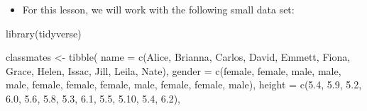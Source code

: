 \documentclass[
  letterpaper,
  DIV=11,
  numbers=noendperiod]{scrreprt}
\newenvironment{Shaded}{\begin{snugshade}}{\end{snugshade}}
\newcommand{\AttributeTok}[1]{\textcolor[rgb]{0.40,0.45,0.13}{#1}}
\newcommand{\FloatTok}[1]{\textcolor[rgb]{0.68,0.00,0.00}{#1}}
\newcommand{\FunctionTok}[1]{\textcolor[rgb]{0.28,0.35,0.67}{#1}}
\newcommand{\NormalTok}[1]{\textcolor[rgb]{0.00,0.23,0.31}{#1}}
\newcommand{\OtherTok}[1]{\textcolor[rgb]{0.00,0.23,0.31}{#1}}
\newcommand{\StringTok}[1]{\textcolor[rgb]{0.13,0.47,0.30}{#1}}
\providecommand{\tightlist}{%
  \setlength{\itemsep}{0pt}\setlength{\parskip}{0pt}}\usepackage{longtable,booktabs,array}
\begin{document}
\begin{itemize}
\tightlist
\item
  For this lesson, we will work with the following small data set:
\end{itemize}

\begin{Shaded}
\begin{Highlighting}[]
\FunctionTok{library}\NormalTok{(tidyverse)}

\NormalTok{classmates }\OtherTok{\textless{}{-}} \FunctionTok{tibble}\NormalTok{(}
  \AttributeTok{name =} \FunctionTok{c}\NormalTok{(}\StringTok{\textquotesingle{}Alice\textquotesingle{}}\NormalTok{, }\StringTok{\textquotesingle{}Brianna\textquotesingle{}}\NormalTok{, }\StringTok{\textquotesingle{}Carlos\textquotesingle{}}\NormalTok{, }\StringTok{\textquotesingle{}David\textquotesingle{}}\NormalTok{, }
           \StringTok{\textquotesingle{}Emmett\textquotesingle{}}\NormalTok{, }\StringTok{\textquotesingle{}Fiona\textquotesingle{}}\NormalTok{, }\StringTok{\textquotesingle{}Grace\textquotesingle{}}\NormalTok{, }\StringTok{\textquotesingle{}Helen\textquotesingle{}}\NormalTok{,}
           \StringTok{\textquotesingle{}Issac\textquotesingle{}}\NormalTok{, }\StringTok{\textquotesingle{}Jill\textquotesingle{}}\NormalTok{, }\StringTok{\textquotesingle{}Leila\textquotesingle{}}\NormalTok{, }\StringTok{\textquotesingle{}Nate\textquotesingle{}}\NormalTok{),}
  \AttributeTok{gender =} \FunctionTok{c}\NormalTok{(}\StringTok{\textquotesingle{}female\textquotesingle{}}\NormalTok{, }\StringTok{\textquotesingle{}female\textquotesingle{}}\NormalTok{, }\StringTok{\textquotesingle{}male\textquotesingle{}}\NormalTok{, }\StringTok{\textquotesingle{}male\textquotesingle{}}\NormalTok{,}
             \StringTok{\textquotesingle{}male\textquotesingle{}}\NormalTok{, }\StringTok{\textquotesingle{}female\textquotesingle{}}\NormalTok{, }\StringTok{\textquotesingle{}female\textquotesingle{}}\NormalTok{, }\StringTok{\textquotesingle{}female\textquotesingle{}}\NormalTok{,}
             \StringTok{\textquotesingle{}male\textquotesingle{}}\NormalTok{, }\StringTok{\textquotesingle{}female\textquotesingle{}}\NormalTok{, }\StringTok{\textquotesingle{}female\textquotesingle{}}\NormalTok{, }\StringTok{\textquotesingle{}male\textquotesingle{}}\NormalTok{),}
  \AttributeTok{height =} \FunctionTok{c}\NormalTok{(}\FloatTok{5.4}\NormalTok{, }\FloatTok{5.9}\NormalTok{, }\FloatTok{5.2}\NormalTok{, }\FloatTok{6.0}\NormalTok{, }\FloatTok{5.6}\NormalTok{, }\FloatTok{5.8}\NormalTok{, }\FloatTok{5.3}\NormalTok{, }\FloatTok{6.1}\NormalTok{, }\FloatTok{5.5}\NormalTok{, }\FloatTok{5.10}\NormalTok{, }\FloatTok{5.4}\NormalTok{, }\FloatTok{6.2}\NormalTok{),}

\end{Highlighting}
\end{Shaded}
\end{document}
